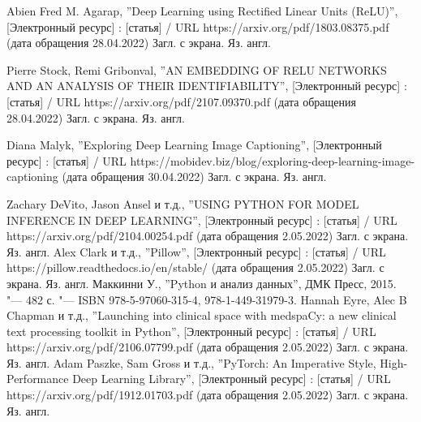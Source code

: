 \documentclass[bachelor, och, coursework]{SCWorks}
\begin{document}
\begin{thebibliography}{99}

     Abien Fred M. Agarap, ''Deep Learning using Rectified Linear
    Units (ReLU)'', [Электронный ресурс] : [статья] / URL
    https://arxiv.org/pdf/1803.08375.pdf (дата обращения 28.04.2022) Загл. с
    экрана. Яз. англ.

     Pierre Stock, Remi Gribonval, ''AN EMBEDDING OF RELU
    NETWORKS AND AN ANALYSIS OF THEIR IDENTIFIABILITY'', [Электронный ресурс] :
    [статья] / URL https://arxiv.org/pdf/2107.09370.pdf (дата обращения
    28.04.2022) Загл. с экрана. Яз. англ.
    

     Diana Malyk, ''Exploring Deep Learning Image
    Captioning'', [Электронный ресурс] : [статья] / URL
    https://mobidev.biz/blog/exploring-deep-learning-image-captioning (дата
    обращения 30.04.2022) Загл. с экрана. Яз. англ.

     Zachary DeVito, Jason Ansel и т.д., ''USING PYTHON FOR MODEL
    INFERENCE IN DEEP LEARNING'', [Электронный ресурс] : [статья] / URL
    https://arxiv.org/pdf/2104.00254.pdf (дата обращения 2.05.2022) Загл. с
    экрана. Яз. англ.
     Alex Clark и т.д., ''Pillow'', [Электронный ресурс] : [статья]
    / URL https://pillow.readthedocs.io/en/stable/ (дата обращения 2.05.2022)
    Загл. с экрана. Яз. англ.
     Маккинни У., ''Python и анализ данных'', ДМК Пресс, 2015.
    "--- 482 с. "--- ISBN 978-5-97060-315-4, 978-1-449-31979-3.
     Hannah Eyre, Alec B Chapman и т.д., ''Launching into clinical
    space with medspaCy: a new clinical text processing toolkit in Python'',
    [Электронный ресурс] : [статья] / URL https://arxiv.org/pdf/2106.07799.pdf
    (дата обращения 2.05.2022) Загл. с экрана. Яз. англ.
     Adam Paszke, Sam Gross и т.д., ''PyTorch: An Imperative
    Style, High-Performance Deep Learning Library'', [Электронный ресурс] :
    [статья] / URL https://arxiv.org/pdf/1912.01703.pdf (дата обращения
    2.05.2022) Загл. с экрана. Яз. англ.


\end{thebibliography}
\end{document}
